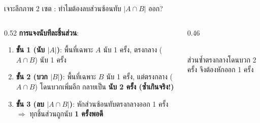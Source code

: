 \begin{frame}{เจาะลึกภาพ 2 เซต : ทำไมต้องลบส่วนซ้อนทับ $|A \cap B|$ ออก?}
  \begin{columns}[T]
    \begin{column}{0.52\textwidth}
      \textbf{การแจงนับทีละชิ้นส่วน}:
      \begin{enumerate}\small
        \item \textbf{ขั้น 1 (นับ $|A|$)}:
              พื้นที่เฉพาะ $A$ นับ 1 ครั้ง, ตรงกลาง ($A \cap B$) นับ 1 ครั้ง
        \item \textbf{ขั้น 2 (บวก $|B|$)}:
              พื้นที่เฉพาะ $B$ นับ 1 ครั้ง, แต่ตรงกลาง ($A \cap B$) โดนบวกเพิ่มอีก กลายเป็น \textbf{\textcolor{Fred}{นับ 2 ครั้ง (ซ้ำเกินจริง!)}}
        \item \textbf{ขั้น 3 (ลบ $|A \cap B|$)}:
              หักส่วนซ้อนทับตรงกลางออก 1 ครั้ง $\Rightarrow$ ทุกชิ้นส่วนถูกนับ \textbf{\textcolor{Tgreen}{1 ครั้งพอดี}}
      \end{enumerate}
    \end{column}
    \begin{column}{0.46\textwidth}
      \begin{center}
      \\
      \footnotesize ส่วนซ้ำตรงกลางโดนบวก 2 ครั้ง จึงต้องหักออก 1 ครั้ง
      \end{center}
    \end{column}
  \end{columns}
\end{frame}

